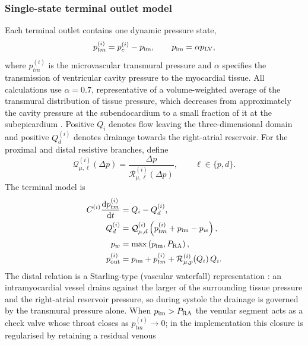\documentclass[lineno]{jfm}
\begin{document}
\subsubsection{Single-state terminal outlet model}
\label{sec:coronary-outlet-model}
Each terminal outlet contains one dynamic pressure state,
\begin{equation}
p_{tm}^{(i)}
=
p_c^{(i)}-p_{\rm im},
\qquad
p_{\rm im}
=
\alpha p_{\rm LV},
\label{eq:coronary-transmural}
\end{equation}
where $p_{tm}^{(i)}$ is the microvascular transmural pressure and $\alpha$
specifies the transmission of ventricular cavity pressure to the myocardial
tissue. All calculations use $\alpha=0.7$, representative of a
volume-weighted average of the transmural distribution of tissue pressure,
which decreases from approximately the cavity pressure at the subendocardium
to a small fraction of it at the subepicardium
\citep{Downey1975,Permutt1963}. Positive $Q_i$ denotes flow leaving the
three-dimensional domain and positive $Q_d^{(i)}$ denotes drainage towards
the right-atrial reservoir.
For the proximal and distal resistive branches, define
\begin{equation}
\mathcal{Q}_{\mu,\ell}^{(i)}(\Delta p)
=
\frac{\Delta p}
{\mathcal{R}_{\mu,\ell}^{(i)}(\Delta p)},
\qquad
\ell\in\{p,d\}.
\label{eq:coronary-rmu-flow-functions}
\end{equation}
The terminal model is
\begin{align}
C^{(i)}
\frac{\mathrm{d}p_{tm}^{(i)}}{\mathrm{d}t}
&=
Q_i-Q_d^{(i)},
\label{eq:coronary-node-balance}\\
Q_d^{(i)}
&=
\mathcal{Q}_{\mu,d}^{(i)}
\left(
p_{tm}^{(i)}+p_{\rm im}-p_w
\right),
\label{eq:coronary-starling}\\
p_w
&=
\max\left(
p_{\rm im},P_{\rm RA}
\right),
\label{eq:coronary-waterfall-pressure}\\
p_{\rm out}^{(i)}
&=
p_{\rm im}
+p_{tm}^{(i)}
+
\mathcal{R}_{\mu,p}^{(i)}\!\left(Q_i\right)Q_i.
\label{eq:coronary-outlet-pressure}
\end{align}
The distal relation is a Starling-type (vascular waterfall) representation
\citep{Downey1975,Permutt1963}: an intramyocardial vessel drains against the
larger of the surrounding tissue pressure and the right-atrial reservoir
pressure, so during systole the drainage is governed by the transmural
pressure alone. When $p_{\rm im}>P_{\rm RA}$ the venular segment acts as a
check valve whose throat closes as $p_{tm}^{(i)}\rightarrow0$; in the
implementation this closure is regularised by retaining a residual venous
\end{document}

